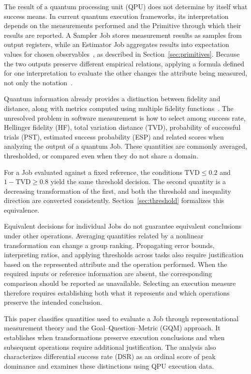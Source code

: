 \documentclass[10pt,conference]{IEEEtran}
\newcommand{\TVD}{\mathrm{TVD}}
\begin{document}
The result of a quantum processing unit (QPU) does not determine by itself what success means. In current quantum execution frameworks, its interpretation depends on the measurements performed and the Primitive through which their results are reported. A Sampler Job stores measurement results as samples from output registers, while an Estimator Job aggregates results into expectation values for chosen observables~\cite{qiskit2024}, as described in Section~\ref{sec:primitives}. Because the two outputs preserve different empirical relations, applying a formula defined for one interpretation to evaluate the other changes the attribute being measured, not only the notation~\cite{fentonBieman2015}.

Quantum information already provides a distinction between fidelity and distance, along with metrics computed using multiple fidelity functions~\cite{gilchrist2005,luo2004,ma2009,nielsen2010}. The unresolved problem in software measurement is how to select among success rate, Hellinger fidelity (HF), total variation distance (TVD), probability of successful trials (PST), estimated success probability (ESP) and related scores when analyzing the output of a quantum Job. These quantities are commonly averaged, thresholded, or compared even when they do not share a domain.

For a Job evaluated against a fixed reference, the conditions $\TVD\le0.2$ and $1-\TVD\ge0.8$ yield the same threshold decision. The second quantity is a decreasing transformation of the first, and both the threshold and inequality direction are converted consistently. Section~\ref{sec:threshold} formalizes this equivalence.

Equivalent decisions for individual Jobs do not guarantee equivalent conclusions under other operations. Averaging quantities related by a nonlinear transformation can change a group ranking. Propagating error bounds, interpreting ratios, and applying thresholds across tasks also require justification based on the represented attribute and the operation performed. When the required inputs or reference information are absent, the corresponding comparison should be reported as unavailable. Selecting an execution measure therefore requires establishing both what it represents and which operations preserve the intended conclusion.

This paper classifies quantities used to evaluate a Job through representational measurement theory and the Goal--Question--Metric (GQM) approach. It establishes when transformations preserve execution conclusions and when subsequent operations require additional justification. The analysis also characterizes differential success rate (DSR) as an ordinal score of peak dominance and examines these distinctions using QPU execution data.
\end{document}
